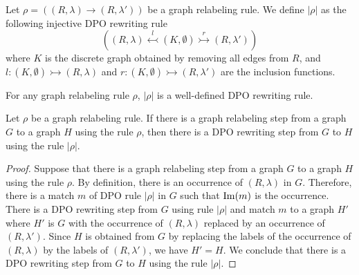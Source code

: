 
\begin{definition}
    \label{def:gls_to_dpo}
    Let $\rho \mathop{=} ((R,\lambda) \mathop{\rightarrow} (R,\lambda'))$ be a graph relabeling rule.
    We define $|\rho|$ as the following injective DPO rewriting rule 
    $$  ((R,\lambda) \overset{l}{\leftarrowtail} (K, \emptyset) \overset{r}{\rightarrowtail} (R,\lambda'))$$ 
    where $K$ is the discrete graph obtained by removing all edges from $R$, and $l : (K,\emptyset) \rightarrowtail (R,\lambda)$ and $r : (K, \emptyset) \rightarrowtail (R,\lambda')$ are the inclusion functions.
\end{definition}
For any graph relabeling rule $\rho$, $|\rho|$ is a well-defined DPO rewriting rule.

\begin{theorem}
    Let $\rho$ be a graph relabeling rule. 
    If there is a graph relabeling step from a graph $G$ to a graph $H$ using the rule $\rho$, then there is a DPO rewriting step from $G$ to $H$ using the rule $|\rho|$.
\end{theorem}
\begin{proof}
    Suppose that there is a graph relabeling step from a graph $G$ to a graph $H$ using the rule $\rho$.
    By definition, there is an occurrence of $(R,\lambda)$ in $G$. Therefore, there is a match $m$ of DPO rule $|\rho|$ in $G$ such that $\operatorname{Im}(m)$ is the occurrence. 
    There is a DPO rewriting step from $G$ using rule $|\rho|$ and match $m$ to a graph $H'$ where $H'$ is $G$ with the occurrence of $(R,\lambda)$ replaced by an occurrence of $(R,\lambda')$. 
    Since $H$ is obtained from $G$ by replacing the labels of the occurrence of $(R,\lambda)$ by the labels of $(R,\lambda')$, we have $H' \mathop{=} H$.
    We conclude that there is a DPO rewriting step from $G$ to $H$ using the rule $|\rho|$.
\end{proof}


